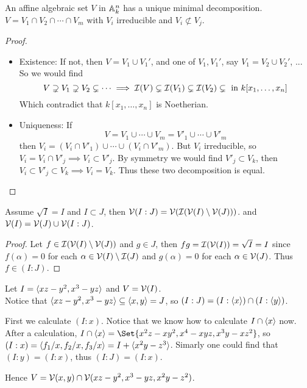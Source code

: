 \begin{prop}
  An affine algebraic set $V$ in $\mathbb{A}^n_k$ has a unique minimal decomposition.
  $V = V_1 \cap V_2 \cap \dotsm \cap V_m$ with $V_i$ irreducible and
  $V_i \not\subset V_j$.
  \begin{proof}
    \begin{itemize} \hfill
        \item Existence: If not, then $V = V_1 \cup V_1'$,
          and one of $V_1, V_1'$, say $V_1 = V_2 \cup V_2'$, ...
          So we would find
          \[ V \supsetneq V_1 \supsetneq V_2 \subsetneq \dotsm
            \implies \mathcal{I}(V) \subsetneq \mathcal{I}(V_1) \subsetneq \mathcal{I}(V_2) \subsetneq
            \text{ in } k[x_1, \dots, x_n] \]
          Which contradict that $k[x_1, \dots, x_n]$ is Noetherian.
        \item Uniqueness: If
          \[ V = V_1 \cup \dotsm \cup V_m = V'_1 \cup \dotsm \cup V'_m \]
          then $V_i = (V_i \cap V'_1) \cup \dotsm \cup (V_i \cap V'_m)$.
          But $V_i$ irreducible, so $V_i = V_i \cap V'_j \implies V_i \subset V'_j$.
          By symmetry we would find $V'_j \subset V_k$, then
          $V_i \subset V'_j \subset V_k \implies V_i = V_k$.
          Thus these two decomposition is equal.
    \end{itemize}
  \end{proof}
\end{prop}

\begin{theorem}[Decomposition]
  Assume $\sqrt{I} = I$ and $I \subset J$, then $\mathcal{V}(I : J) = \mathcal{V}(\mathcal{I}(\mathcal{V}(I) \setminus \mathcal{V}(J)))$.
  and $\mathcal{V}(I) = \mathcal{V}(J) \cup \mathcal{V}(I: J)$.
  \begin{proof}
    Let $f \in \mathcal{I}(\mathcal{V}(I) \setminus \mathcal{V}(J))$ and $g \in J$,
    then $fg = \mathcal{I}(\mathcal{V}(I)) = \sqrt{I} = I$ since $f(\alpha) = 0$
    for each $\alpha \in \mathcal{V}(I) \setminus \mathcal{I}(J)$ and $g(\alpha) = 0$
    for each $\alpha \in \mathcal{V}(J)$. Thus $f \in (I: J)$.
  \end{proof}
\end{theorem}

\begin{example}
  Let $I = \langle xz - y^2, x^3 - yz \rangle$ and $V = \mathcal{V}(I)$. \\

  Notice that $\langle xz - y^2 , x^3 - yz \rangle \subseteq \langle x, y \rangle = J$,
  so $(I: J) = (I: \langle x \rangle) \cap (I: \langle y\rangle)$.

  First we calculate $(I: x)$. Notice that we know how to calculate $I \cap \langle x\rangle$ now.
  After a calculation, $I \cap \gen{x} = \Set{x^2z - xy^2, x^4 - xyz, x^3y - xz^2}$,
  so $(I: x) = \langle f_1/x, f_2/x, f_3/x\rangle = I + \langle x^2y - z^3\rangle$.
  Simarly one could find that $(I: y) = (I: x)$, thus $(I: J) = (I: x)$.

  Hence $V = \mathcal{V}(x, y) \cap \mathcal{V}(xz-y^2, x^3-yz, x^2y - z^2)$.
\end{example}

